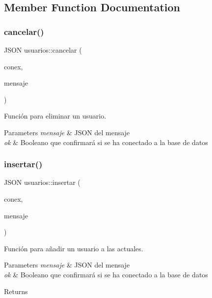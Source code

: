 \subsection{Member Function Documentation}
\mbox{\label{classusuarios_a3a93fae14bb3554e1b9d4742dd9e6a97}} 
\subsubsection{\texorpdfstring{cancelar()}{cancelar()}}
{\footnotesize\ttfamily J\+S\+ON usuarios\+::cancelar (\begin{DoxyParamCaption}\item[{bool}]{conex,  }\item[{J\+S\+ON}]{mensaje }\end{DoxyParamCaption})}



Función para eliminar un usuario. 


\begin{DoxyParams}{Parameters}
{\em mensaje} & J\+S\+ON del mensaje \\
\hline
{\em ok} & Booleano que confirmará si se ha conectado a la base de datos \\
\hline
\end{DoxyParams}
\mbox{\label{classusuarios_a6939c773dde8627785009eacd28dd9a8}} 
\subsubsection{\texorpdfstring{insertar()}{insertar()}}
{\footnotesize\ttfamily J\+S\+ON usuarios\+::insertar (\begin{DoxyParamCaption}\item[{bool}]{conex,  }\item[{J\+S\+ON}]{mensaje }\end{DoxyParamCaption})}



Función para añadir un usuario a las actuales. 


\begin{DoxyParams}{Parameters}
{\em mensaje} & J\+S\+ON del mensaje \\
\hline
{\em ok} & Booleano que confirmará si se ha conectado a la base de datos \\
\hline
\end{DoxyParams}
\begin{DoxyReturn}{Returns}

\end{DoxyReturn}
\mbox{\label{classusuarios_ad875eae5fff50925fa35dfa80728a87e}} 
